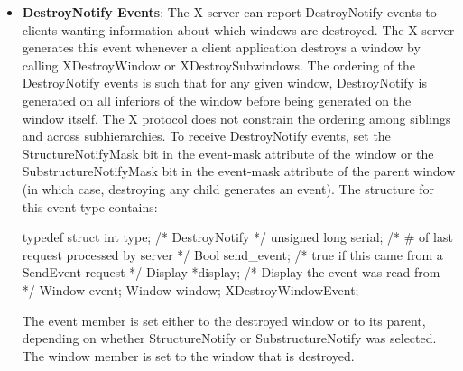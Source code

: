 \documentclass{report}
\begin{document}
\begin{itemize}
            \bigbreak \noindent 
            The parent member is set to the created window’s parent. The window member specifies the created window. The x and y members are set to the created window’s coordinates relative to the parent window’s origin and indicate the position of the upper-left outside corner of the created window. The width and height members are set to the inside size of the created window (not including the border) and are always nonzero. The border\_width member is set to the width of the created window’s border, in pixels. The override\_redirect member is set to the override-redirect attribute of the window. Window manager clients normally should ignore this window if the override\_redirect member is True.
        \item \textbf{DestroyNotify Events}: The X server can report DestroyNotify events to clients wanting information about which windows are destroyed. The X server generates this event whenever a client application destroys a window by calling XDestroyWindow or XDestroySubwindows.
            \bigbreak \noindent 
            The ordering of the DestroyNotify events is such that for any given window, DestroyNotify is generated on all inferiors of the window before being generated on the window itself. The X protocol does not constrain the ordering among siblings and across subhierarchies.
            \bigbreak \noindent 
            To receive DestroyNotify events, set the StructureNotifyMask bit in the event-mask attribute of the window or the SubstructureNotifyMask bit in the event-mask attribute of the parent window (in which case, destroying any child generates an event).
            \bigbreak \noindent 
            The structure for this event type contains:
            \bigbreak \noindent 
            \begin{cppcode}
                typedef struct {
                    int type; /* DestroyNotify */
                    unsigned long serial; /* # of last request processed by server */
                    Bool send_event; /* true if this came from a SendEvent request */
                    Display *display; /* Display the event was read from */
                    Window event;
                    Window window;
                } XDestroyWindowEvent;
            \end{cppcode}
            \bigbreak \noindent 
            The event member is set either to the destroyed window or to its parent, depending on whether StructureNotify or SubstructureNotify was selected. The window member is set to the window that is destroyed.

\end{itemize}
\end{document}
